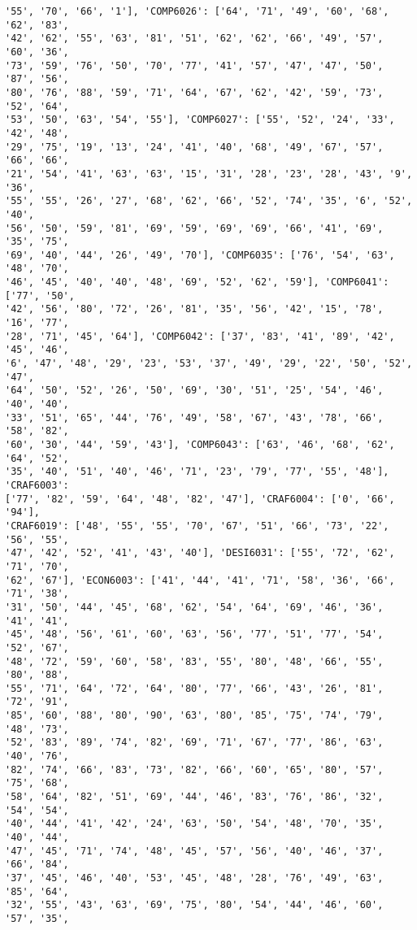 \documentclass[11pt]{article}
\begin{document}
\begin{Verbatim}[commandchars=\\\{\}]
'55', '70', '66', '1'], 'COMP6026': ['64', '71', '49', '60', '68', '62', '83',
'42', '62', '55', '63', '81', '51', '62', '62', '66', '49', '57', '60', '36',
'73', '59', '76', '50', '70', '77', '41', '57', '47', '47', '50', '87', '56',
'80', '76', '88', '59', '71', '64', '67', '62', '42', '59', '73', '52', '64',
'53', '50', '63', '54', '55'], 'COMP6027': ['55', '52', '24', '33', '42', '48',
'29', '75', '19', '13', '24', '41', '40', '68', '49', '67', '57', '66', '66',
'21', '54', '41', '63', '63', '15', '31', '28', '23', '28', '43', '9', '36',
'55', '55', '26', '27', '68', '62', '66', '52', '74', '35', '6', '52', '40',
'56', '50', '59', '81', '69', '59', '69', '69', '66', '41', '69', '35', '75',
'69', '40', '44', '26', '49', '70'], 'COMP6035': ['76', '54', '63', '48', '70',
'46', '45', '40', '40', '48', '69', '52', '62', '59'], 'COMP6041': ['77', '50',
'42', '56', '80', '72', '26', '81', '35', '56', '42', '15', '78', '16', '77',
'28', '71', '45', '64'], 'COMP6042': ['37', '83', '41', '89', '42', '45', '46',
'6', '47', '48', '29', '23', '53', '37', '49', '29', '22', '50', '52', '47',
'64', '50', '52', '26', '50', '69', '30', '51', '25', '54', '46', '40', '40',
'33', '51', '65', '44', '76', '49', '58', '67', '43', '78', '66', '58', '82',
'60', '30', '44', '59', '43'], 'COMP6043': ['63', '46', '68', '62', '64', '52',
'35', '40', '51', '40', '46', '71', '23', '79', '77', '55', '48'], 'CRAF6003':
['77', '82', '59', '64', '48', '82', '47'], 'CRAF6004': ['0', '66', '94'],
'CRAF6019': ['48', '55', '55', '70', '67', '51', '66', '73', '22', '56', '55',
'47', '42', '52', '41', '43', '40'], 'DESI6031': ['55', '72', '62', '71', '70',
'62', '67'], 'ECON6003': ['41', '44', '41', '71', '58', '36', '66', '71', '38',
'31', '50', '44', '45', '68', '62', '54', '64', '69', '46', '36', '41', '41',
'45', '48', '56', '61', '60', '63', '56', '77', '51', '77', '54', '52', '67',
'48', '72', '59', '60', '58', '83', '55', '80', '48', '66', '55', '80', '88',
'55', '71', '64', '72', '64', '80', '77', '66', '43', '26', '81', '72', '91',
'85', '60', '88', '80', '90', '63', '80', '85', '75', '74', '79', '48', '73',
'52', '83', '89', '74', '82', '69', '71', '67', '77', '86', '63', '40', '76',
'82', '74', '66', '83', '73', '82', '66', '60', '65', '80', '57', '75', '68',
'58', '64', '82', '51', '69', '44', '46', '83', '76', '86', '32', '54', '54',
'40', '44', '41', '42', '24', '63', '50', '54', '48', '70', '35', '40', '44',
'47', '45', '71', '74', '48', '45', '57', '56', '40', '46', '37', '66', '84',
'37', '45', '46', '40', '53', '45', '48', '28', '76', '49', '63', '85', '64',
'32', '55', '43', '63', '69', '75', '80', '54', '44', '46', '60', '57', '35',

\end{Verbatim}
\end{document}
